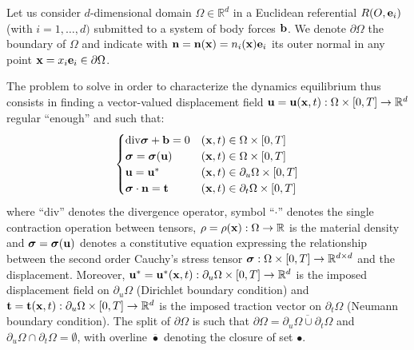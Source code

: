 \documentclass{report}
\newcommand{\bx}{\textbf{x}}
\newcommand{\bb}{\textbf{b}}
\newcommand{\bu}{\textbf{u}}
\newcommand{\bt}{\boldsymbol t}
\def\bsigma{\mbox{\boldmath${\sigma}$}}
\def\bb{{\bf{b}}}
\def\be{{\bf e}}
\def\be{{\bf{e}}}
\def\bn{{\bf{n}}}
\def\bx{{\bf{x}}}
\def\bt{{\bf t}}
\def\bu{{\bf{u}}}
\begin{document}
Let us consider $d$-dimensional domain $\Omega\in\mathbb{R}^{d}$ in a Euclidean referential $R(O,\be_{i})$ (with $i=1,\dots,d)$ submitted to a system of body forces $\bb$. We denote $\partial\Omega$ the boundary of $\Omega$ and indicate with $\bn=\bn(\bx)=n_{i}(\bx)\be_{i}$
its outer normal in any point $\bx=x_{i}\be_{i}\in\partial\Omega$.

The problem to solve in order to characterize the dynamics equilibrium thus consists in finding a vector-valued displacement field $\bu=\bu(\bx,t):\Omega\times[0,T]\to\mathbb{R}^{d}$
regular ``enough'' and such that: 
\begin{equation}
\begin{cases}
\mathrm{\mathrm{div}}\bsigma+\bb=0 & (\bx,t)\in\Omega\times[0,T]\\
\bsigma=\bsigma(\bu) & (\bx,t)\in\Omega\times[0,T]\\
\bu=\bu^{*} & (\bx,t)\in\partial_{u}\Omega\times[0,T]\\
\bsigma\cdot\bn=\bt & (\bx,t)\in\partial_{t}\Omega\times[0,T]
\end{cases}
\end{equation}
where ``$\mathrm{\mathrm{div}}$'' denotes the divergence operator, symbol ``$\cdot$'' denotes the single contraction operation between tensors, $\rho=\rho(\bx):\Omega\to\mathbb{R}$ is the material density and $\bsigma=\bsigma(\bu)$ denotes a constitutive equation
expressing the relationship between the second order Cauchy's stress tensor $\bsigma:\Omega\times[0,T]\to\mathbb{R}^{d\times d}$ and the displacement. Moreover, $\bu^{*}=\bu^{*}(\bx,t):\partial_{u}\Omega\times[0,T]\to\mathbb{R}^{d}$ is the imposed displacement field on $\partial_{u}\Omega$ (Dirichlet
boundary condition) and 
$\bt=\bt(\bx,t):\partial_{u}\Omega\times[0,T]\to\mathbb{R}^{d}$
is the imposed traction vector on $\partial_{t}\Omega$ (Neumann boundary condition). The split of $\partial\Omega$ is such that $\partial\Omega=\overline{\partial_{u}\Omega\cup\partial_{t}\Omega}$ and $\partial_{u}\Omega\cap\partial_{t}\Omega=\emptyset$, with overline $\overline{\bullet}$ denoting the closure of set $\bullet$.
\end{document}
